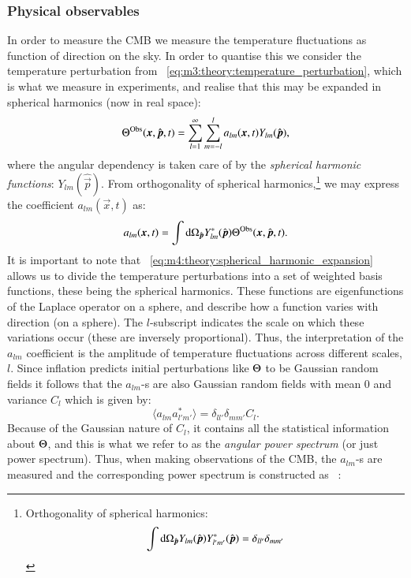     \subsubsection{Physical observables}
        In order to measure the CMB we measure the temperature fluctuations as function of direction on the sky. In order to quantise this we consider the temperature perturbation from ~\cref{eq:m3:theory:temperature_perturbation}, which is what we measure in experiments, and realise that this may be expanded in spherical harmonics (now in real space):
        \begin{equation}\label{eq:m4:theory:spherical_harmonic_expansion}
            \Theta^\mathrm{Obs}(\boldsymbol{x}, \hat{\boldsymbol{p}}, t) = \sum_{l=1}^\infty\sum_{m=-l}^l a_{lm}(\boldsymbol{x}, t)Y_{lm}(\hat{\boldsymbol{p}}),
        \end{equation}
        where the angular dependency is taken care of by the \textit{spherical harmonic functions}: $Y_{lm}(\hat{\vec{p}})$. From orthogonality of spherical harmonics,\footnote{Orthogonality of spherical harmonics:$$\int\mathrm{d}\Omega_{\hat{\boldsymbol{p}}}Y_{lm}(\hat{\boldsymbol{p}})Y^*_{l'm'}(\hat{\boldsymbol{p}}) = \delta_{ll'}\delta_{mm'}$$} we may express the coefficient $a_{lm}(\vec{x},t)$ as:
        \begin{equation}\label{eq:m4:theory:alm_coefficients}
            a_{lm}(\boldsymbol{x},t) = \int\mathrm{d}\Omega_{\hat{\boldsymbol{p}}}Y^*_{lm}(\hat{\boldsymbol{p}})\Theta^\mathrm{Obs}(\boldsymbol{x}, \hat{\boldsymbol{p}},t).
        \end{equation}
        It is important to note that ~\cref{eq:m4:theory:spherical_harmonic_expansion} allows us to divide the temperature perturbations into a set of weighted basis functions, these being the spherical harmonics. These functions are eigenfunctions of the Laplace operator on a sphere, and describe how a function varies with direction (on a sphere). The $l$-subscript indicates the scale on which these variations occur (these are inversely proportional). Thus, the interpretation of the $a_{lm}$ coefficient is the amplitude of temperature fluctuations across different scales, $l$. Since inflation predicts initial perturbations like $\Theta$ to be Gaussian random fields it follows that the $a_{lm}$-s are also Gaussian random fields with mean 0 and variance $C_l$ which is given by: 
        \begin{equation}\label{eq:m4:theory:alm_coeff_variance}
            \langle a_{lm}a^*_{l'm'}\rangle = \delta_{ll'}\delta_{mm'}C_l.
        \end{equation}
        Because of the Gaussian nature of $C_l$, it contains all the statistical information about $\Theta$, and this is what we refer to as the \textit{angular power spectrum} (or just power spectrum). Thus, when making observations of the CMB, the $a_{lm}$-s are measured and the corresponding power spectrum is constructed as ~\cite{AST5220LectureNotes}:
